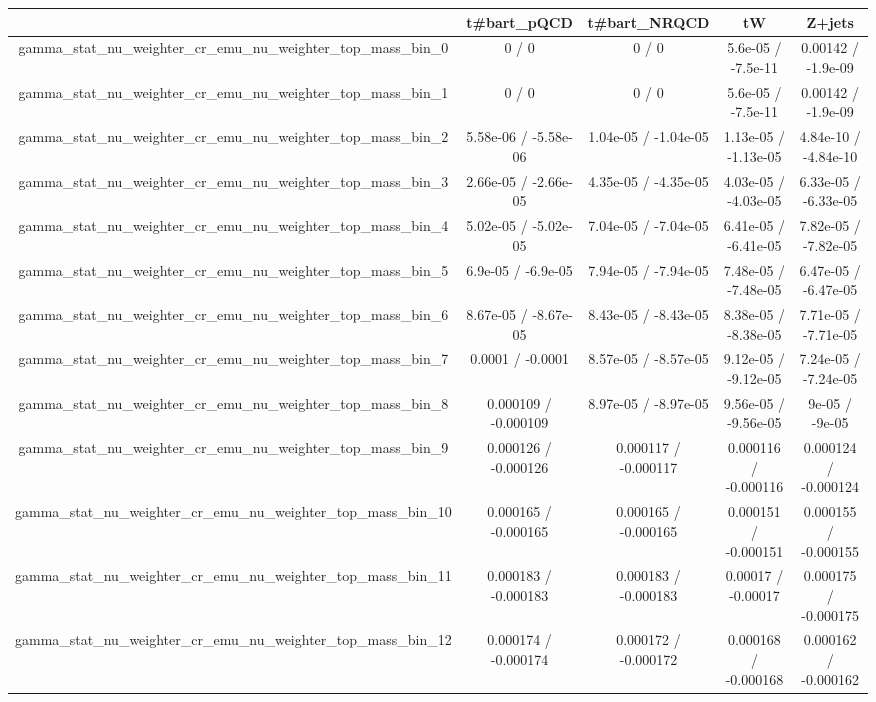\documentclass[10pt]{article}
\begin{document}
\begin{table}[htbp]
\begin{center}
\begin{tabular}{|c|c|c|c|c|}
\hline 
      & t#bar{t}_{pQCD}      & t#bar{t}_{NRQCD}      & tW      & Z+jets \\ 
\hline 
  gamma_stat_nu_weighter_cr_emu_nu_weighter_top_mass_bin_0 & 0 / 0 & 0 / 0 & 5.6e-05 / -7.5e-11 & 0.00142 / -1.9e-09 \\ 
  gamma_stat_nu_weighter_cr_emu_nu_weighter_top_mass_bin_1 & 0 / 0 & 0 / 0 & 5.6e-05 / -7.5e-11 & 0.00142 / -1.9e-09 \\ 
  gamma_stat_nu_weighter_cr_emu_nu_weighter_top_mass_bin_2 & 5.58e-06 / -5.58e-06 & 1.04e-05 / -1.04e-05 & 1.13e-05 / -1.13e-05 & 4.84e-10 / -4.84e-10 \\ 
  gamma_stat_nu_weighter_cr_emu_nu_weighter_top_mass_bin_3 & 2.66e-05 / -2.66e-05 & 4.35e-05 / -4.35e-05 & 4.03e-05 / -4.03e-05 & 6.33e-05 / -6.33e-05 \\ 
  gamma_stat_nu_weighter_cr_emu_nu_weighter_top_mass_bin_4 & 5.02e-05 / -5.02e-05 & 7.04e-05 / -7.04e-05 & 6.41e-05 / -6.41e-05 & 7.82e-05 / -7.82e-05 \\ 
  gamma_stat_nu_weighter_cr_emu_nu_weighter_top_mass_bin_5 & 6.9e-05 / -6.9e-05 & 7.94e-05 / -7.94e-05 & 7.48e-05 / -7.48e-05 & 6.47e-05 / -6.47e-05 \\ 
  gamma_stat_nu_weighter_cr_emu_nu_weighter_top_mass_bin_6 & 8.67e-05 / -8.67e-05 & 8.43e-05 / -8.43e-05 & 8.38e-05 / -8.38e-05 & 7.71e-05 / -7.71e-05 \\ 
  gamma_stat_nu_weighter_cr_emu_nu_weighter_top_mass_bin_7 & 0.0001 / -0.0001 & 8.57e-05 / -8.57e-05 & 9.12e-05 / -9.12e-05 & 7.24e-05 / -7.24e-05 \\ 
  gamma_stat_nu_weighter_cr_emu_nu_weighter_top_mass_bin_8 & 0.000109 / -0.000109 & 8.97e-05 / -8.97e-05 & 9.56e-05 / -9.56e-05 & 9e-05 / -9e-05 \\ 
  gamma_stat_nu_weighter_cr_emu_nu_weighter_top_mass_bin_9 & 0.000126 / -0.000126 & 0.000117 / -0.000117 & 0.000116 / -0.000116 & 0.000124 / -0.000124 \\ 
  gamma_stat_nu_weighter_cr_emu_nu_weighter_top_mass_bin_10 & 0.000165 / -0.000165 & 0.000165 / -0.000165 & 0.000151 / -0.000151 & 0.000155 / -0.000155 \\ 
  gamma_stat_nu_weighter_cr_emu_nu_weighter_top_mass_bin_11 & 0.000183 / -0.000183 & 0.000183 / -0.000183 & 0.00017 / -0.00017 & 0.000175 / -0.000175 \\ 
  gamma_stat_nu_weighter_cr_emu_nu_weighter_top_mass_bin_12 & 0.000174 / -0.000174 & 0.000172 / -0.000172 & 0.000168 / -0.000168 & 0.000162 / -0.000162 \\ 

\end{tabular}
\end{center}
\end{table}
\end{document}
